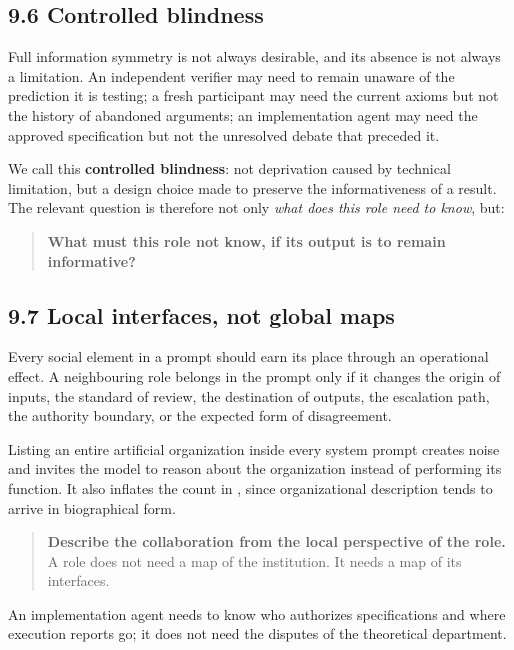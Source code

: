 \subsection*{9.6 Controlled blindness}
\label{sec:en:9.6}

Full information symmetry is not always desirable, and its absence is not always a limitation. An independent verifier may need to remain unaware of the prediction it is testing; a fresh participant may need the current axioms but not the history of abandoned arguments; an implementation agent may need the approved specification but not the unresolved debate that preceded it.

We call this \textbf{controlled blindness}: not deprivation caused by technical limitation, but a design choice made to preserve the informativeness of a result. The relevant question is therefore not only \emph{what does this role need to know}, but:

\begin{quote}
\textbf{What must this role not know, if its output is to remain informative?}
\end{quote}

\subsection*{9.7 Local interfaces, not global maps}
\label{sec:en:9.7}

Every social element in a prompt should earn its place through an operational effect. A neighbouring role belongs in the prompt only if it changes the origin of inputs, the standard of review, the destination of outputs, the escalation path, the authority boundary, or the expected form of disagreement.

Listing an entire artificial organization inside every system prompt creates noise and invites the model to reason about the organization instead of performing its function. It also inflates the count in , since organizational description tends to arrive in biographical form.

\begin{quote}
\textbf{Describe the collaboration from the local perspective of the role.} A role does not need a map of the institution. It needs a map of its interfaces.
\end{quote}
An implementation agent needs to know who authorizes specifications and where execution reports go; it does not need the disputes of the theoretical department.


